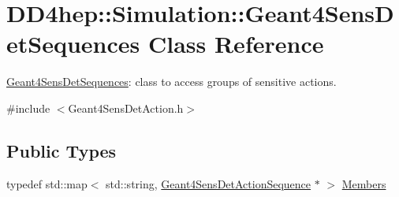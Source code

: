 \hypertarget{class_d_d4hep_1_1_simulation_1_1_geant4_sens_det_sequences}{}\section{D\+D4hep\+:\+:Simulation\+:\+:Geant4\+Sens\+Det\+Sequences Class Reference}
\label{class_d_d4hep_1_1_simulation_1_1_geant4_sens_det_sequences}


\hyperlink{class_d_d4hep_1_1_simulation_1_1_geant4_sens_det_sequences}{Geant4\+Sens\+Det\+Sequences}\+: class to access groups of sensitive actions.  




{\ttfamily \#include $<$Geant4\+Sens\+Det\+Action.\+h$>$}

\subsection*{Public Types}
\begin{DoxyCompactItemize}
\item 
typedef std\+::map$<$ std\+::string, \hyperlink{class_d_d4hep_1_1_simulation_1_1_geant4_sens_det_action_sequence}{Geant4\+Sens\+Det\+Action\+Sequence} $\ast$ $>$ \hyperlink{class_d_d4hep_1_1_simulation_1_1_geant4_sens_det_sequences_a2266138a517dd9b784af9234312fdd12}{Members}
\end{DoxyCompactItemize}
